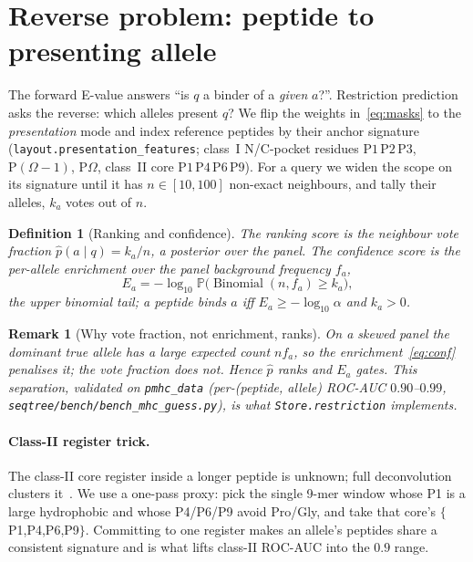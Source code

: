 \documentclass[11pt]{article}
\theoremstyle{oldplain}
\theoremstyle{oldrem}
\newtheorem{definition}{Definition}
\newtheorem{remark}{Remark}
\DeclareMathOperator{\Binomial}{Binomial}
\newcommand{\Prob}{\mathbb{P}}
\begin{document}
\section{Reverse problem: peptide to presenting allele}\label{sec:reverse}
The forward E-value answers ``is $q$ a binder of a \emph{given} $a$?''. Restriction prediction asks
the reverse: which alleles present $q$? We flip the weights in~\eqref{eq:masks} to the
\emph{presentation} mode and index reference peptides by their anchor signature
(\texttt{layout.presentation\_features}; class~I N/C-pocket residues
$\mathrm{P1\,P2\,P3}$, $\mathrm{P}(\Omega{-}1)$, $\mathrm{P}\Omega$, class~II core
$\mathrm{P1\,P4\,P6\,P9}$). For a query
we widen the scope on its signature until it has $n\in[10,100]$ non-exact neighbours, and tally their
alleles, $k_a$ votes out of $n$.

\begin{definition}[Ranking and confidence]\label{def:reverse}
The \emph{ranking} score is the neighbour vote fraction $\hat p(a\mid q)=k_a/n$, a posterior over the
panel. The \emph{confidence} score is the per-allele enrichment over the panel background frequency
$f_a$,
\begin{equation}\label{eq:conf}
  E_a=-\log_{10}\Prob\!\big(\Binomial(n,f_a)\ge k_a\big),
\end{equation}
the upper binomial tail; a peptide binds $a$ iff $E_a\ge-\log_{10}\alpha$ and $k_a>0$.
\end{definition}

\begin{remark}[Why vote fraction, not enrichment, ranks]
On a skewed panel the dominant true allele has a large expected count $n f_a$, so the
enrichment~\eqref{eq:conf} \emph{penalises} it; the vote fraction does not. Hence $\hat p$ ranks and
$E_a$ gates. This separation, validated on \texttt{pmhc\_data} (per-(peptide, allele) ROC-AUC
$0.90$--$0.99$, \texttt{seqtree/bench/bench\_mhc\_guess.py}), is what \texttt{Store.restriction}
implements.
\end{remark}

\paragraph{Class-II register trick.} The class-II core register inside a longer peptide is unknown;
full deconvolution clusters it~\cite{Andreatta2017,Alvarez2019}. We use a one-pass proxy: pick the
single 9-mer window whose P1 is a large hydrophobic and whose P4/P6/P9 avoid Pro/Gly, and take that
core's $\{$P1,P4,P6,P9$\}$. Committing to one register makes an allele's peptides share a consistent
signature and is what lifts class-II ROC-AUC into the $0.9$ range.
\end{document}
